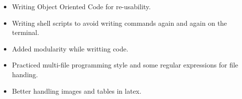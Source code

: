 \begin{itemize}
  \item Writing Object Oriented Code for re-usability.
  \item Writing shell scripts to avoid writing commands again and again on the terminal.
  \item Added modularity while writting code.
  \item Practiced multi-file programming style and some regular expressions for file handing.
  \item Better handling images and tables in latex.
\end{itemize}